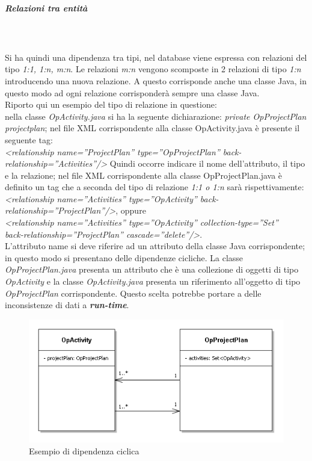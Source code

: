 \subparagraph{Relazioni tra entit\`{a}} \quad \quad \\ \\
Si ha quindi una dipendenza tra tipi, nel database viene espressa con relazioni del tipo \textit{1:1, 1:n, m:n}. Le relazioni \textit{m:n} vengono scomposte in 2 relazioni di tipo \textit{1:n} introducendo una nuova relazione. A questo corrisponde anche una classe Java, in questo modo ad ogni relazione corrisponder\`{a} sempre una classe Java.\\
Riporto qui un esempio del tipo di relazione in questione: \\
nella classe \textit{OpActivity.java} si ha la seguente dichiarazione: \textit{private OpProjectPlan projectplan}; nel file XML corrispondente alla classe OpActivity.java \`{e} presente il seguente tag: \\
\textit{<relationship name=''ProjectPlan'' type=''OpProjectPlan'' back-relationship=''Activities''/>}
Quindi occorre indicare il nome dell\textquoteright{}attributo, il tipo e la relazione; nel file XML corrispondente alla classe OpProjectPlan.java \`{e} definito un tag che a seconda del tipo di relazione \textit{1:1 o 1:n} sar\`{a} rispettivamente: \\
\textit{<relationship name=''Activities'' type=''OpActivity'' back-relationship=''ProjectPlan''/>}, oppure \\
\textit{<relationship name=''Activities'' type=''OpActivity'' collection-type=''Set'' \\ back-relationship=''ProjectPlan'' cascade=''delete''/>}.\\
L\textquoteright{}attributo name si deve riferire ad un attributo della classe Java corrispondente; in questo modo si presentano delle dipendenze cicliche. La classe \textit{OpProjectPlan.java} presenta un attributo che \`{e} una collezione di oggetti di tipo \textit{OpActivity} e la classe \textit{OpActivity.java} presenta un riferimento all\textquoteright{}oggetto di tipo \textit{OpProjectPlan} corrispondente. Questo scelta potrebbe portare a delle inconsistenze di dati a \textit{\textbf{run-time}}.

\begin{figure}[H]
\begin{center}
\includegraphics[width=1\textwidth]{img/DipendenzaCiclica.png}
\caption{Esempio di dipendenza ciclica}
\label{fig:Esempio di dipendenza ciclica}
\end{center}
\end{figure}
